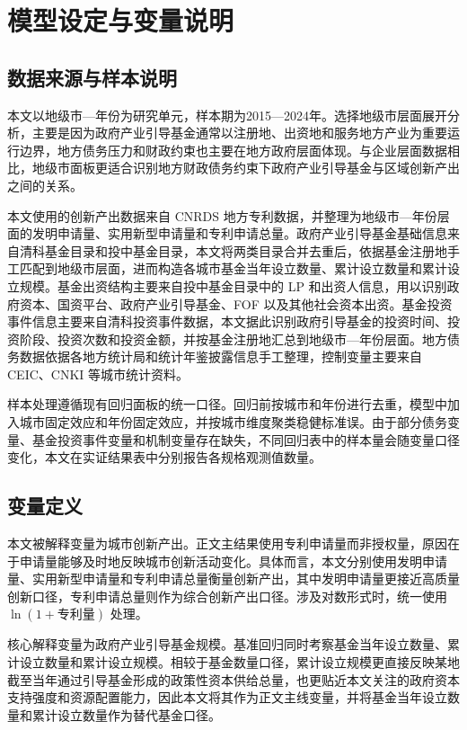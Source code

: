 
\section{模型设定与变量说明}

\subsection{数据来源与样本说明}

本文以地级市—年份为研究单元，样本期为2015—2024年。选择地级市层面展开分析，主要是因为政府产业引导基金通常以注册地、出资地和服务地方产业为重要运行边界，地方债务压力和财政约束也主要在地方政府层面体现。与企业层面数据相比，地级市面板更适合识别地方财政债务约束下政府产业引导基金与区域创新产出之间的关系。

本文使用的创新产出数据来自 CNRDS 地方专利数据，并整理为地级市—年份层面的发明申请量、实用新型申请量和专利申请总量。政府产业引导基金基础信息来自清科基金目录和投中基金目录，本文将两类目录合并去重后，依据基金注册地手工匹配到地级市层面，进而构造各城市基金当年设立数量、累计设立数量和累计设立规模。基金出资结构主要来自投中基金目录中的 LP 和出资人信息，用以识别政府资本、国资平台、政府产业引导基金、FOF 以及其他社会资本出资。基金投资事件信息主要来自清科投资事件数据，本文据此识别政府引导基金的投资时间、投资阶段、投资次数和投资金额，并按基金注册地汇总到地级市—年份层面。地方债务数据依据各地方统计局和统计年鉴披露信息手工整理，控制变量主要来自 CEIC、CNKI 等城市统计资料。

样本处理遵循现有回归面板的统一口径。回归前按城市和年份进行去重，模型中加入城市固定效应和年份固定效应，并按城市维度聚类稳健标准误。由于部分债务变量、基金投资事件变量和机制变量存在缺失，不同回归表中的样本量会随变量口径变化，本文在实证结果表中分别报告各规格观测值数量。

\subsection{变量定义}

本文被解释变量为城市创新产出。正文主结果使用专利申请量而非授权量，原因在于申请量能够及时地反映城市创新活动变化。具体而言，本文分别使用发明申请量、实用新型申请量和专利申请总量衡量创新产出，其中发明申请量更接近高质量创新口径，专利申请总量则作为综合创新产出口径。涉及对数形式时，统一使用 $\ln(1+\text{专利量})$ 处理。

核心解释变量为政府产业引导基金规模。基准回归同时考察基金当年设立数量、累计设立数量和累计设立规模。相较于基金数量口径，累计设立规模更直接反映某地截至当年通过引导基金形成的政策性资本供给总量，也更贴近本文关注的政府资本支持强度和资源配置能力，因此本文将其作为正文主线变量，并将基金当年设立数量和累计设立数量作为替代基金口径。

